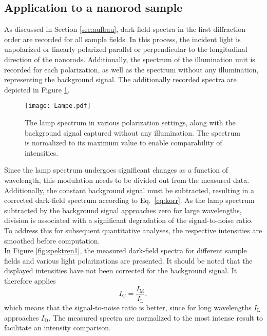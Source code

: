 \subsection{\label{sec:A2}Application to a nanorod sample}
As discussed in Section \ref{sec:aufbau}, dark-field spectra in the first diffraction 
order are recorded for all sample fields. 
In this process, the incident light is unpolarized or linearly polarized parallel or perpendicular 
to the longitudinal direction of the nanorods. 
Additionally, the spectrum of the illumination unit is recorded for each polarization, 
as well as the spectrum without any illumination, representing the background signal. 
The additionally recorded spectra are depicted in Figure \ref{fig:lampe}.
\begin{figure}[h!]
    \centering
    \texttt{[image: Lampe.pdf]}
    \caption{\label{fig:lampe}The lamp spectrum in various polarization settings, 
    along with the background signal captured without any illumination.
    The spectrum is normalized to its maximum value to enable comparability of intensities.}
\end{figure}\FloatBarrier
Since the lamp spectrum undergoes significant changes as a function of wavelength, 
this modulation needs to be divided out from the measured data. 
Additionally, the constant background signal must be subtracted, resulting in a corrected 
dark-field spectrum according to Eq.~\eqref{eq:korr}. 
As the lamp spectrum subtracted by the background signal approaches zero for large wavelengths, 
division is associated with a significant degradation of the signal-to-noise ratio. 
To address this for subsequent quantitative analyses, the respective intensities 
are smoothed before computation. \\
In Figure \ref{fig:spektren1}, the measured dark-field spectra for different sample 
fields and various light polarizations are presented. 
It should be noted that the displayed intensities have not been corrected for the background signal.
It therefore applies
\begin{equation}\label{eq:wrong}
    I_{\text{C}} = \frac{I_{\text{M}}}{I_{\text{L}}},
\end{equation} 
which means that the signal-to-noise ratio is better, since for long wavelengths 
$I_{\text{L}}$ approaches $I_{\text{D}}$.
The measured spectra are normalized to the most intense result to facilitate an intensity comparison. \\ \\

